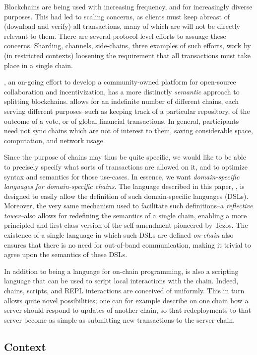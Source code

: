 Blockchains are being used with increasing frequency, and for increasingly
diverse purposes. This had led to scaling concerns, as clients must keep
abreast of (download and verify) all transactions, many of which are will not be
directly relevant to them.  There are several protocol-level efforts to assuage
these concerns. Sharding, channels, side-chains, three examples of such
efforts, work by (in restricted contexts) loosening the requirement that all
transactions must take place in a single chain.

\oscoin{}, an on-going effort to develop a community-owned
platform for open-source collaboration and incentivization, has a more
distinctly \textit{semantic} approach to splitting blockchains.  \oscoin{}
allows for an indefinite number of different chains, each serving different
purposes--such as keeping track of a particular repository, of the outcome of
a vote, or of global financial transactions. In general, participants need not
sync chains which are not of interest to them, saving considerable space,
computation, and network usage.

Since the purpose of chains may thus be quite specific, we would like to be
able to precisely specify what sorts of transactions are allowed on it, and to
optimize syntax and semantics for those use-cases. In essence, we want
\textit{domain-specific languages for domain-specific chains}. The language
described in this paper, \rad, is designed to easily allow the definition of
such domain-specific languages (DSLs). Moreover, the very same mechanism used to
facilitate such definitions--a \textit{reflective tower}--also
allows for redefining the semantics of a single chain, enabling a more
principled and first-class version of the self-amendment pioneered by
Tezos.\cite{Goodman2014} The existence of a single language in which such DSLs
are defined \textit{on-chain} also ensures that there is no need for
out-of-band communication, making it trivial to agree upon the semantics of
these DSLs.

In addition to being a language for on-chain programming, \rad is also a
scripting language that can be used to script local interactions with the
chain. Indeed, chains, scripts, and REPL interactions are conceived of
uniformly. This in turn allows quite novel possibilities; one can for
example describe on one chain how a server should respond to updates of another
chain, so that redeployments to that server become as simple as submitting new
transactions to the server-chain.

\subsection{Context}

